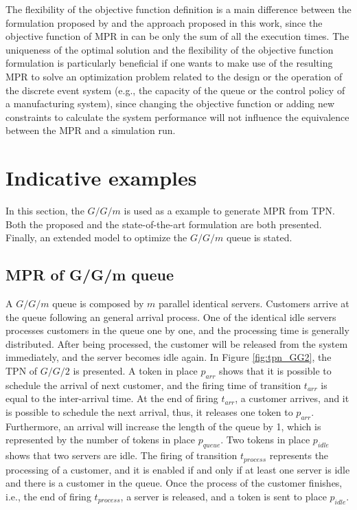 \documentclass[suppldata]{interact}
\theoremstyle{plain}
\theoremstyle{definition}
\theoremstyle{remark}
\begin{document}
The flexibility of the objective function definition is a main difference between the formulation proposed by \cite{chan2008optimization} and the approach proposed in this work, since the objective function of MPR in \cite{chan2008optimization} can be only the sum of all the execution times. The uniqueness of the optimal solution and the flexibility of the objective function formulation is particularly beneficial if one wants to make use of the resulting MPR to solve an optimization problem %
related to the design or the operation of the discrete event system (e.g., %
the capacity of the queue or the control policy of a manufacturing system), since changing the objective function or adding new constraints to calculate the system performance will not influence the equivalence between the  MPR and a simulation run. %


\section{Indicative examples} \label{sec:example}
In this section, the $G/G/m$ is used as a example to generate MPR from TPN. Both the proposed and the state-of-the-art formulation are both presented. Finally, an extended model to optimize the $G/G/m$ queue is stated. 

\subsection{MPR of G/G/m queue}\label{sec:MPR_ggm}
A $G/G/m$ queue is composed by $m$ parallel identical servers. Customers arrive at the queue following an general arrival process. One of the identical idle servers processes customers in the queue one by one, and the processing time is generally distributed. After being processed, the customer will be released from the system immediately, and the server becomes idle again. In Figure \ref{fig:tpn_GG2}, the TPN of $G/G/2$ is presented. A token in place $p_{arr}$ shows that it is possible to schedule the arrival of next customer, and the firing time of transition $t_{arr}$ is equal to the inter-arrival time. At the end of firing $t_{arr}$, a customer arrives, and it is possible to schedule the next arrival, thus, it releases one token to $p_{arr}$. Furthermore, an arrival will increase the length of the queue by 1, which is represented by the number of tokens in place $p_{queue}$. Two tokens in place $p_{idle}$ shows that two servers are idle. The firing of transition $t_{process}$ represents the processing of a customer, and it is enabled if and only if at least one server is idle and there is a customer in the queue. Once the process of the customer finishes, i.e., the end of firing $t_{process}$, a server is released, and a token is sent to place $p_{idle}$.
\end{document}
